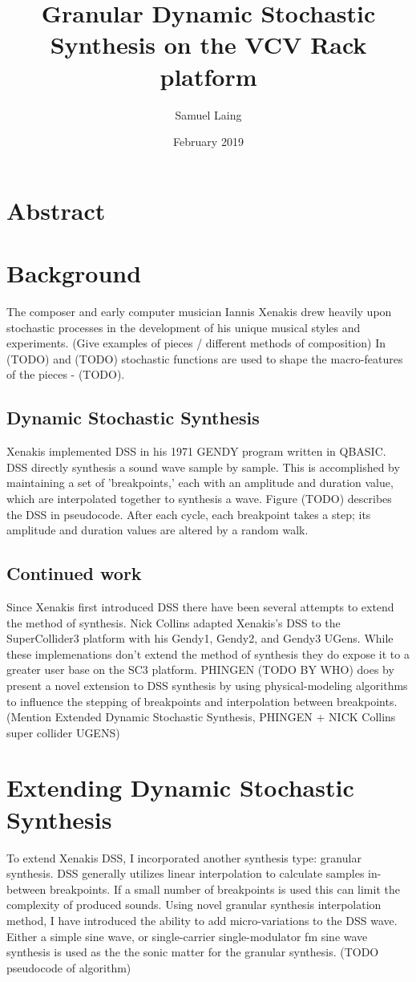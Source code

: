 \documentclass{article}
\title{Granular Dynamic Stochastic Synthesis on the VCV Rack platform}
\author{Samuel Laing}
\date{February 2019}
\begin{document}
\maketitle

\pagebreak
\section{Abstract}

\section{Background}
The composer and early computer musician Iannis Xenakis drew heavily upon stochastic processes in the development of his unique musical styles and experiments. (Give examples of pieces / different methods of composition) In (TODO) and (TODO) stochastic functions are used to shape the macro-features of the pieces - (TODO). 

\subsection{Dynamic Stochastic Synthesis}
Xenakis implemented DSS in his 1971 GENDY program written in QBASIC. DSS directly synthesis a sound wave sample by sample. This is accomplished by maintaining a set of 'breakpoints,' each with an amplitude and duration value, which are interpolated together to synthesis a wave. Figure (TODO) describes the DSS in pseudocode. After each cycle, each breakpoint takes a step; its amplitude and duration values are altered by a random walk. 

\subsection{Continued work}
Since Xenakis first introduced DSS there have been several attempts to extend the method of synthesis. Nick Collins adapted Xenakis's DSS to the SuperCollider3 platform with his Gendy1, Gendy2, and Gendy3 UGens. While these implemenations don't extend the method of synthesis they do expose it to a greater user base on the SC3 platform. PHINGEN (TODO BY WHO) does by present a novel extension to DSS synthesis by using physical-modeling algorithms to influence the stepping of breakpoints and interpolation between breakpoints. (Mention Extended Dynamic Stochastic Synthesis, PHINGEN + NICK Collins super collider UGENS)

\section{Extending Dynamic Stochastic Synthesis}
To extend Xenakis DSS, I incorporated another synthesis type: granular synthesis. DSS generally utilizes linear interpolation to calculate samples in-between breakpoints. If a small number of breakpoints is used this can limit the complexity of produced sounds. Using novel granular synthesis interpolation method, I have introduced the ability to add micro-variations to the DSS wave. Either a simple sine wave, or single-carrier single-modulator fm sine wave synthesis is used as the the sonic matter for the granular synthesis. (TODO pseudocode of algorithm)
\end{document}
